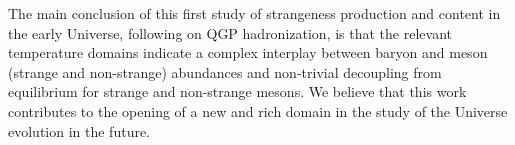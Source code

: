 The main conclusion of this first study of strangeness production and content in the early Universe, following on QGP hadronization, is that the relevant temperature domains indicate a complex interplay between baryon and meson (strange and non-strange) abundances and non-trivial decoupling from equilibrium for strange and non-strange mesons. We believe that this work contributes to the opening of a new and rich domain in the study of the Universe evolution in the future. 
